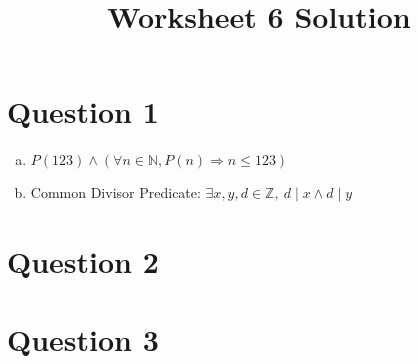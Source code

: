 \documentclass[12pt]{article}
\begin{document}
\title{Worksheet 6 Solution}
\maketitle

\section*{Question 1}
\begin{enumerate}[a.]
    \item

    $P(123) \land (\forall n \in \mathbb{N}, P(n) \Rightarrow n \leq 123)$

    \item

    Common Divisor Predicate: $\exists x,y,d \in \mathbb{Z},\:d \mid x \land d \mid y$

\end{enumerate}

\section*{Question 2}

\section*{Question 3}
\end{document}
